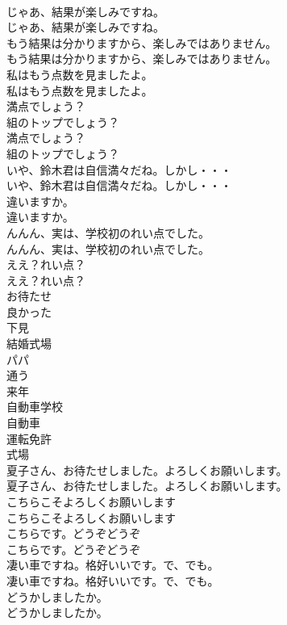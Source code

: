 \documentclass[8pt]{extreport}
\begin{document}
\begin{CJK}{UTF8}{min}
\\	じゃあ、結果が楽しみですね。	
\\	じゃあ、結果が楽しみですね。 
\\	もう結果は分かりますから、楽しみではありません。	
\\	もう結果は分かりますから、楽しみではありません。 
\\	私はもう点数を見ましたよ。	
\\	私はもう点数を見ましたよ。 
\\	満点でしょう？
\\	組のトップでしょう？	
\\	満点でしょう？
\\	組のトップでしょう？ 
\\	いや、鈴木君は自信満々だね。しかし・・・	
\\	いや、鈴木君は自信満々だね。しかし・・・ 
\\	違いますか。	
\\	違いますか。 
\\	んんん、実は、学校初のれい点でした。	
\\	んんん、実は、学校初のれい点でした。 
\\	ええ？れい点？	
\\	ええ？れい点？ 
\\	お待たせ
\\	良かった
\\	下見
\\	結婚式場
\\	パパ
\\	通う
\\	来年
\\	自動車学校
\\	自動車
\\	運転免許
\\	式場
\\	夏子さん、お待たせしました。よろしくお願いします。	
\\	夏子さん、お待たせしました。よろしくお願いします。 
\\	こちらこそよろしくお願いします	
\\	こちらこそよろしくお願いします 
\\	こちらです。どうぞどうぞ	
\\	こちらです。どうぞどうぞ 
\\	凄い車ですね。格好いいです。で、でも。	
\\	凄い車ですね。格好いいです。で、でも。 
\\	どうかしましたか。	
\\	どうかしましたか。 

\end{CJK}
\end{document}
